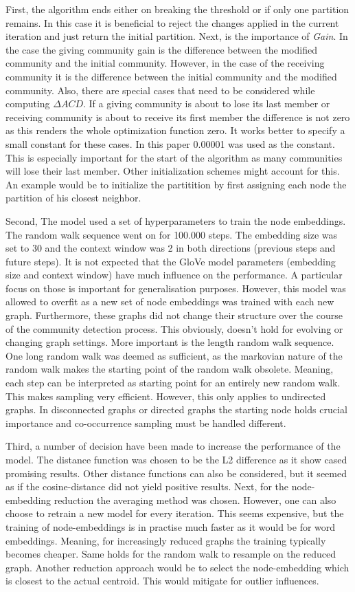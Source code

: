 \documentclass[11pt, twocolumn]{article}
\begin{document}
First, the algorithm ends either on breaking the threshold or if only one partition remains. In this case it is beneficial to reject the changes applied in the current iteration and just return the initial partition. Next, is the importance of \emph{Gain}. In the case the giving community gain is the difference between the modified community and the initial community. However, in the case of the receiving community it is the difference between the initial community and the modified community. Also, there are special cases that need to be considered while computing $\Delta ACD$. If a giving community is about to lose its last member or receiving community is about to receive its first member the difference is not zero as this renders the whole optimization function zero. It works better to specify a small constant for these cases. In this paper 0.00001 was used as the constant. This is especially important for the start of the algorithm as many communities will lose their last member. Other initialization schemes might account for this. An example would be to initialize the partitition by first assigning each node the partition of his closest neighbor. 

Second, The model used a set of hyperparameters to train the node embeddings. The random walk sequence went on for 100.000 steps. The embedding size was set to 30 and the context window was 2 in both directions (previous steps and future steps). It is not expected that the GloVe model parameters (embedding size and context window) have much influence on the performance. A particular focus on those is important for generalisation purposes. However, this model was allowed to overfit as a new set of node embeddings was trained with each new graph. Furthermore, these graphs did not change their structure over the course of the community detection process. This obviously, doesn't hold for evolving or changing graph settings. More important is the length random walk sequence. One long random walk was deemed as sufficient, as the markovian nature of the random walk makes the starting point of the random walk obsolete. Meaning, each step can be interpreted as starting point for an entirely new random walk. This makes sampling very efficient. However, this only applies to undirected graphs. In disconnected graphs or directed graphs the starting node holds crucial importance and co-occurrence sampling must be handled different. 

Third, a number of decision have been made to increase the performance of the model. The distance function was chosen to be the L2 difference as it show cased promising results. Other distance functions can also be considered, but it seemed as if the cosine-distance did not yield positive results. Next, for the node-embedding reduction the averaging method was chosen. However, one can also choose to retrain a new model for every iteration. This seems expensive, but the training of node-embeddings is in practise much faster as it would be for word embeddings. Meaning, for increasingly reduced graphs the training typically becomes cheaper. Same holds for the random walk to resample on the reduced graph. Another reduction approach would be to select the node-embedding which is closest to the actual centroid. This would mitigate for outlier influences. 
\end{document}
